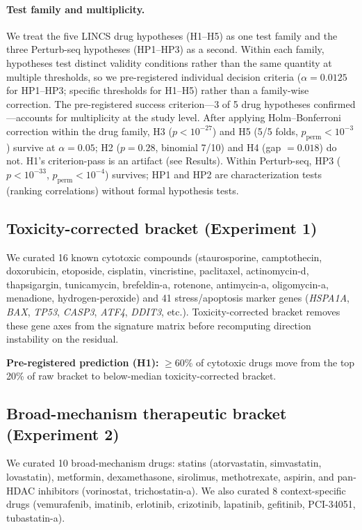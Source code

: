 \documentclass{article}
\begin{document}
\paragraph{Test family and multiplicity.}
We treat the five LINCS drug hypotheses (H1--H5) as one test family and the
three Perturb-seq hypotheses (HP1--HP3) as a second. Within each family,
hypotheses test distinct validity conditions rather than the same quantity at
multiple thresholds, so we pre-registered individual decision criteria
($\alpha = 0.0125$ for HP1--HP3; specific thresholds for H1--H5) rather than
a family-wise correction. The pre-registered success criterion---3 of 5 drug
hypotheses confirmed---accounts for multiplicity at the study level.
After applying Holm--Bonferroni correction within the drug family, H3
($p < 10^{-27}$) and H5 (5/5 folds, $p_{\text{perm}} < 10^{-3}$) survive at
$\alpha = 0.05$; H2 ($p = 0.28$, binomial 7/10) and H4 (gap $= 0.018$)
do not. H1's criterion-pass is an artifact (see Results). Within Perturb-seq,
HP3 ($p < 10^{-33}$, $p_{\text{perm}} < 10^{-4}$) survives; HP1 and HP2 are characterization tests
(ranking correlations) without formal hypothesis tests.

\subsection{Toxicity-corrected bracket (Experiment 1)}

We curated 16 known cytotoxic compounds (staurosporine, camptothecin,
doxorubicin, etoposide, cisplatin, vincristine, paclitaxel, actinomycin-d,
thapsigargin, tunicamycin, brefeldin-a, rotenone, antimycin-a, oligomycin-a,
menadione, hydrogen-peroxide) and 41 stress/apoptosis marker genes
(\emph{HSPA1A}, \emph{BAX}, \emph{TP53}, \emph{CASP3}, \emph{ATF4},
\emph{DDIT3}, etc.). Toxicity-corrected bracket removes these gene axes from
the signature matrix before recomputing direction instability on the residual.

\textbf{Pre-registered prediction (H1):} $\geq$60\% of cytotoxic drugs move
from the top 20\% of raw bracket to below-median toxicity-corrected bracket.

\subsection{Broad-mechanism therapeutic bracket (Experiment 2)}

We curated 10 broad-mechanism drugs: statins (atorvastatin, simvastatin,
lovastatin), metformin, dexamethasone, sirolimus, methotrexate, aspirin,
and pan-HDAC inhibitors (vorinostat, trichostatin-a). We also curated 8
context-specific drugs (vemurafenib, imatinib, erlotinib, crizotinib,
lapatinib, gefitinib, PCI-34051, tubastatin-a).
\end{document}
